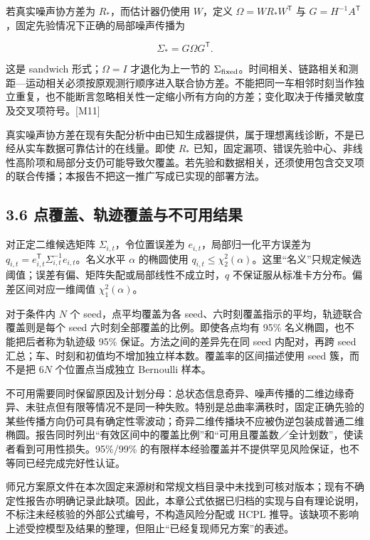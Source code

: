 \documentclass[12pt,a4paper]{article}
\begin{document}
若真实噪声协方差为 \(R_*\)，而估计器仍使用 \(W\)，定义
\(\Omega=WR_*W^{\mathsf T}\) 与
\(G=H^{-1}A^{\mathsf T}\)，固定先验情况下正确的局部噪声传播为

\[\Sigma_*=G\Omega G^{\mathsf T}.\]

这是 sandwich 形式；\(\Omega=I\) 才退化为上一节的
\(\Sigma_{\rm fixed}\)。时间相关、链路相关和测距---运动相关必须按原观测行顺序进入联合协方差。不能把同一车相邻时刻当作独立重复，也不能断言忽略相关性一定缩小所有方向的方差；变化取决于传播灵敏度及交叉项符号。{[}M11{]}

真实噪声协方差在现有失配分析中由已知生成器提供，属于理想离线诊断，不是已经从实车数据可靠估计的在线量。即使
\(R_*\)
已知，固定漏项、错误先验中心、非线性高阶项和局部分支仍可能导致欠覆盖。若先验和数据相关，还须使用包含交叉项的联合传播；本报告不把这一推广写成已实现的部署方法。

\subsection{3.6
点覆盖、轨迹覆盖与不可用结果}\label{ux70b9ux8986ux76d6ux8f68ux8ff9ux8986ux76d6ux4e0eux4e0dux53efux7528ux7ed3ux679c}

对正定二维候选矩阵 \(\Sigma_{i,t}\)，令位置误差为
\(e_{i,t}\)，局部归一化平方误差为
\(q_{i,t}=e_{i,t}^{\mathsf T}\Sigma_{i,t}^{-1}e_{i,t}\)。名义水平
\(\alpha\) 的椭圆使用
\(q_{i,t}\le\chi^2_2(\alpha)\)。这里``名义''只规定候选阈值；误差有偏、矩阵失配或局部线性不成立时，\(q\)
不保证服从标准卡方分布。偏差区间对应一维阈值 \(\chi^2_1(\alpha)\)。

对于条件内 \(N\) 个 seed，点平均覆盖为各
seed、六时刻覆盖指示的平均，轨迹联合覆盖则是每个 seed
六时刻全部覆盖的比例。即使各点均有 95\% 名义椭圆，也不能把后者称为轨迹级
95\% 保证。方法之间的差异先在同 seed 内配对，再跨 seed
汇总；车、时刻和初值均不增加独立样本数。覆盖率的区间描述使用 seed
簇，而不是把 \(6N\) 个位置点当成独立 Bernoulli 样本。

不可用需要同时保留原因及计划分母：总状态信息奇异、噪声传播的二维边缘奇异、未驻点但有限等情况不是同一种失败。特别是总曲率满秩时，固定正确先验的某些传播方向仍可具有确定性零波动；奇异二维传播块不应被伪逆包装成普通二维椭圆。报告同时列出``有效区间中的覆盖比例''和``可用且覆盖数／全计划数''，使读者看到可用性损失。95\%/99\%
的有限样本经验覆盖并不提供罕见风险保证，也不等同已经完成完好性认证。

师兄方案原文件在本次固定来源树和常规文档目录中未找到可核对版本；现有不确定性报告亦明确记录此缺项。因此，本章公式依据已归档的实现与自有理论说明，不标注未经核验的外部公式编号，不构造风险分配或
HCPL
推导。该缺项不影响上述受控模型及结果的整理，但阻止``已经复现师兄方案''的表述。
\end{document}
